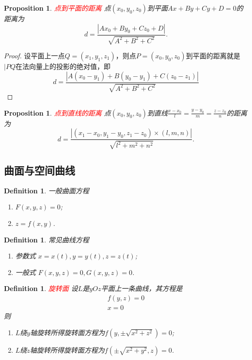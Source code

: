 \documentclass{article}
\newtheorem{proposition}[theorem]{Proposition}
\newtheorem{definition}[theorem]{Definition}
\newcommand{\redt}[1]{\textcolor{red}{#1}}
\begin{document}
\begin{proposition}
\rm \redt{点到平面的距离} 点$(x_0,y_0,z_0)$到平面$Ax + By + Cy + D =0$的距离为
$$
d = \frac{|Ax_0 + By_0 + Cz_0 + D|}{\sqrt{A^2 + B^2 + C^2}}.
$$
\end{proposition}

\begin{proof}
设平面上一点$Q=(x_1,y_1,z_1)$，则点$P=(x_0,y_0,z_0)$到平面的距离就是$\vert{PQ}$在法向量上的投影的绝对值，即
$$
d = \frac{|A(x_0-y_1) + B(y_0-y_1) + C(z_0-z_1)|}{\sqrt{A^2 + B^2 + C^2}}
$$
\end{proof}

\begin{proposition}
\rm \redt{点到直线的距离} 点$(x_0,y_0,z_0)$到直线$\frac{x-x_0}{l} = \frac{y-y_0}{m} = \frac{z-z_0}{n}$的距离为
$$
d = \frac{|(x_1-x_0,y_1-y_0,z_1-z_0) \times (l,m,n)|}{\sqrt{l^2+m^2+n^2}}.
$$
\end{proposition}


\subsection{曲面与空间曲线}

\begin{definition}
\rm 一般曲面方程
\begin{enumerate}
	\item $F(x,y,z) = 0$;
	\item $z = f(x,y)$.
\end{enumerate}
\end{definition}

\begin{definition}
\rm 常见曲线方程
\begin{enumerate}
	\item 参数式 $x = x(t),y = y(t),z = z(t)$;
	\item 一般式 $F(x,y,z) = 0, G(x,y,z) = 0$. 
\end{enumerate}
\end{definition}

\begin{definition}
\rm \redt{旋转面} 设$L$是$yOz$平面上一条曲线，其方程是
$$
\begin{array}{ll}
f(y,z) = 0 \\
x= 0
\end{array}
$$
则
\begin{enumerate}
	\item $L$绕$y$轴旋转所得旋转面方程为$f(y,\pm \sqrt{x^2+z^2}) = 0$;
	\item $L$绕$z$轴旋转所得旋转面方程为$f(\pm \sqrt{x^2 + y^2},z) = 0$. 
\end{enumerate}
\end{definition}
\end{document}
